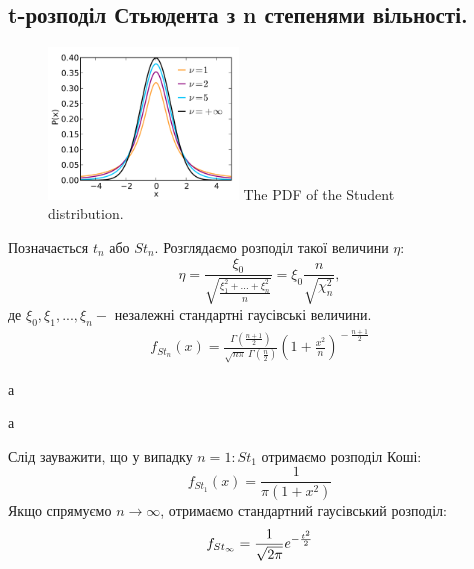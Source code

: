 \subsection{t-розподіл Стьюдента з n степенями вільності.}
\begin{figure}
\centering
\includegraphics[width=0.45\textwidth]{assets/lectures_part_3-91d0349d.png}
The PDF of the Student distribution.
\end{figure}
Позначається $t_n $ або $ St_n$. Розглядаємо розподіл такої величини $\eta$:
$$\eta = \frac{\xi_0}{\sqrt{ \frac{\xi_1^2 + ... + \xi_n^2}{n} }} = \xi_0 \frac{n}{ \sqrt{
\chi^2_n
}} ,$$
де $\xi_0, \xi_1, ... , \xi_n - $ незалежні стандартні гаусівські величини.
$$
\begin{gathered}
f_{St_n}(x) = \frac{\Gamma(\frac{n+1}{2})} {\sqrt{n\pi}\,\Gamma(\frac{n}{2})} \left(1+\frac{x^2}{n} \right)^{\!-\frac{n+1}{2}}
\end{gathered}
$$

$а$\\
\par
$а$\\
\par
Слід зауважити, що у випадку $n = 1 : St_1$ отримаємо розподіл Коші:
$$
f_{St_1} (x) = \frac{1}{ \pi ( 1 + x^2)}
$$
Якщо спрямуємо $n \to \infty$, отримаємо стандартний гаусівський розподіл:
$$
f_{St_\infty} = \frac{1}{\sqrt{2 \pi}} e^{- \frac{t^2}{2} }
$$



